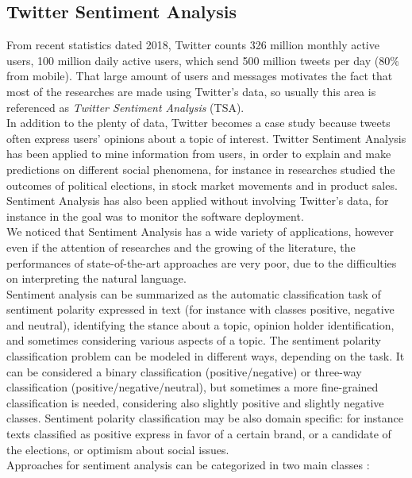 \subsection{Twitter Sentiment Analysis}
From recent statistics dated 2018, Twitter counts 326 million monthly active users, 100 million daily active users, which send 500 million tweets per day (80\% from mobile). That large amount of users and messages motivates the fact that most of the researches are made using Twitter's data, so usually this area is referenced as \textit{Twitter Sentiment Analysis} (TSA).\\
In addition to the plenty of data, Twitter becomes a case study because tweets often express users' opinions about a topic of interest. Twitter Sentiment Analysis has been applied to mine information from users, in order to explain and make predictions on different social phenomena, for instance in \cite{bermingham-smeaton-2011-using} researches studied the outcomes of political elections, in \cite{bollen2011twitter} stock market movements and in \cite{Rui:2013:WCM:2528554.2528633} product sales. Sentiment Analysis has also been applied without involving Twitter's data, for instance in \cite{JURADO201582} the goal was to monitor the software deployment.\\
We noticed that Sentiment Analysis has a wide variety of applications, however even if the attention of researches and the growing of the literature, the performances of state-of-the-art approaches are very poor, due to the difficulties on interpreting the natural language.\\
Sentiment analysis can be summarized as the automatic classification task of sentiment polarity expressed in text (for instance with classes positive, negative and neutral), identifying the stance about a topic, opinion holder identification, and sometimes considering various aspects of a topic. The sentiment polarity classification problem can be modeled in different ways, depending on the task. It can be considered a binary classification (positive/negative) or three-way classification (positive/negative/neutral), but sometimes a more fine-grained classification is needed, considering also slightly positive and slightly negative classes. Sentiment polarity classification may be also domain specific: for instance texts classified as positive express in favor of a certain brand, or a candidate of the elections, or optimism about social issues.\\
Approaches for sentiment analysis can be categorized in two main classes \cite{Zimbra:2018:STS:3210372.3185045}:
